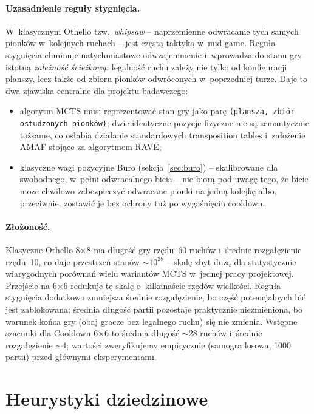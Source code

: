 \documentclass[11pt,a4paper]{article}
\begin{document}
\paragraph{Uzasadnienie reguły stygnięcia.} W~klasycznym Othello tzw.\ \emph{whipsaw} -- naprzemienne odwracanie tych samych pionków w~kolejnych ruchach -- jest częstą taktyką w~mid-game. Reguła stygnięcia eliminuje natychmiastowe odwzajemnienie i~wprowadza do stanu gry istotną \emph{zależność ścieżkową}: legalność ruchu zależy nie tylko od konfiguracji planszy, lecz także od zbioru pionków odwróconych w~poprzedniej turze. Daje to dwa zjawiska centralne dla projektu badawczego:
\begin{itemize}[leftmargin=1.5em,itemsep=2pt]
    \item algorytm MCTS musi reprezentować stan gry jako parę \texttt{(plansza, zbiór ostudzonych pionków)}; dwie identyczne pozycje fizyczne nie są semantycznie tożsame, co osłabia działanie standardowych transposition tables \cite{childs2008transpositions} i~założenie AMAF stojące za algorytmem RAVE;
    \item klasyczne wagi pozycyjne Buro (sekcja~\ref{sec:buro}) -- skalibrowane dla swobodnego, w~pełni odwracalnego bicia -- nie biorą pod uwagę tego, że bicie może chwilowo zabezpieczyć odwracane pionki na jedną kolejkę albo, przeciwnie, zostawić je bez ochrony tuż po wygaśnięciu cooldown.
\end{itemize}

\paragraph{Złożoność.} Klasyczne Othello 8$\times$8 ma długość gry rzędu~60 ruchów i~średnie rozgałęzienie rzędu~10, co daje przestrzeń stanów $\sim\!10^{28}$ -- skalę zbyt dużą dla statystycznie wiarygodnych porównań wielu wariantów MCTS w~jednej pracy projektowej. Przejście na 6$\times$6 redukuje tę skalę o~kilkanaście rzędów wielkości. Reguła stygnięcia dodatkowo zmniejsza średnie rozgałęzienie, bo część potencjalnych bić jest zablokowana; średnia długość partii pozostaje praktycznie niezmieniona, bo warunek końca gry (obaj gracze bez legalnego ruchu) się nie zmienia. Wstępne szacunki dla Cooldown 6$\times$6 to średnia długość $\sim\!28$ ruchów i~średnie rozgałęzienie $\sim\!4$; wartości zweryfikujemy empirycznie (samogra losowa, 1000 partii) przed głównymi eksperymentami.

\section{Heurystyki dziedzinowe}\label{sec:heuristics}
\end{document}
